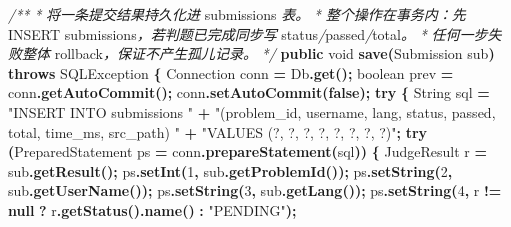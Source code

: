 \documentclass[
  11pt,
]{ctexart}
\newenvironment{Shaded}{\begin{snugshade}}{\end{snugshade}}
\newcommand{\BuiltInTok}[1]{#1}
\newcommand{\CommentTok}[1]{\textcolor[rgb]{0.56,0.35,0.01}{\textit{#1}}}
\newcommand{\ControlFlowTok}[1]{\textcolor[rgb]{0.13,0.29,0.53}{\textbf{#1}}}
\newcommand{\DataTypeTok}[1]{\textcolor[rgb]{0.13,0.29,0.53}{#1}}
\newcommand{\DecValTok}[1]{\textcolor[rgb]{0.00,0.00,0.81}{#1}}
\newcommand{\FunctionTok}[1]{\textcolor[rgb]{0.13,0.29,0.53}{\textbf{#1}}}
\newcommand{\KeywordTok}[1]{\textcolor[rgb]{0.13,0.29,0.53}{\textbf{#1}}}
\newcommand{\NormalTok}[1]{#1}
\newcommand{\OperatorTok}[1]{\textcolor[rgb]{0.81,0.36,0.00}{\textbf{#1}}}
\newcommand{\StringTok}[1]{\textcolor[rgb]{0.31,0.60,0.02}{#1}}
\begin{document}
\begin{Shaded}
\begin{Highlighting}[]
    \CommentTok{/**}
     \CommentTok{*} \CommentTok{将一条提交结果持久化进}\NormalTok{ submissions }\CommentTok{表。}
     \CommentTok{*} \CommentTok{整个操作在事务内：先}\NormalTok{ INSERT submissions}\CommentTok{，若判题已完成同步写}\NormalTok{ status}\CommentTok{/}\NormalTok{passed}\CommentTok{/}\NormalTok{total}\CommentTok{。}
     \CommentTok{*} \CommentTok{任何一步失败整体}\NormalTok{ rollback}\CommentTok{，保证不产生孤儿记录。}
     \CommentTok{*/}
    \KeywordTok{public} \DataTypeTok{void} \FunctionTok{save}\OperatorTok{(}\NormalTok{Submission sub}\OperatorTok{)} \KeywordTok{throws} \BuiltInTok{SQLException} \OperatorTok{\{}
        \BuiltInTok{Connection}\NormalTok{ conn }\OperatorTok{=}\NormalTok{ Db}\OperatorTok{.}\FunctionTok{get}\OperatorTok{();}
        \DataTypeTok{boolean}\NormalTok{ prev }\OperatorTok{=}\NormalTok{ conn}\OperatorTok{.}\FunctionTok{getAutoCommit}\OperatorTok{();}
\NormalTok{        conn}\OperatorTok{.}\FunctionTok{setAutoCommit}\OperatorTok{(}\KeywordTok{false}\OperatorTok{);}
        \ControlFlowTok{try} \OperatorTok{\{}
            \BuiltInTok{String}\NormalTok{ sql }\OperatorTok{=} \StringTok{"INSERT INTO submissions "} \OperatorTok{+}
                         \StringTok{"(problem\_id, username, lang, status, passed, total, time\_ms, src\_path) "} \OperatorTok{+}
                         \StringTok{"VALUES (?, ?, ?, ?, ?, ?, ?, ?)"}\OperatorTok{;}
            \ControlFlowTok{try} \OperatorTok{(}\BuiltInTok{PreparedStatement}\NormalTok{ ps }\OperatorTok{=}\NormalTok{ conn}\OperatorTok{.}\FunctionTok{prepareStatement}\OperatorTok{(}\NormalTok{sql}\OperatorTok{))} \OperatorTok{\{}
\NormalTok{                JudgeResult r }\OperatorTok{=}\NormalTok{ sub}\OperatorTok{.}\FunctionTok{getResult}\OperatorTok{();}
\NormalTok{                ps}\OperatorTok{.}\FunctionTok{setInt}\OperatorTok{(}\DecValTok{1}\OperatorTok{,}\NormalTok{ sub}\OperatorTok{.}\FunctionTok{getProblemId}\OperatorTok{());}
\NormalTok{                ps}\OperatorTok{.}\FunctionTok{setString}\OperatorTok{(}\DecValTok{2}\OperatorTok{,}\NormalTok{ sub}\OperatorTok{.}\FunctionTok{getUserName}\OperatorTok{());}
\NormalTok{                ps}\OperatorTok{.}\FunctionTok{setString}\OperatorTok{(}\DecValTok{3}\OperatorTok{,}\NormalTok{ sub}\OperatorTok{.}\FunctionTok{getLang}\OperatorTok{());}
\NormalTok{                ps}\OperatorTok{.}\FunctionTok{setString}\OperatorTok{(}\DecValTok{4}\OperatorTok{,}\NormalTok{ r }\OperatorTok{!=} \KeywordTok{null} \OperatorTok{?}\NormalTok{ r}\OperatorTok{.}\FunctionTok{getStatus}\OperatorTok{().}\FunctionTok{name}\OperatorTok{()} \OperatorTok{:} \StringTok{"PENDING"}\OperatorTok{);}

\end{Highlighting}
\end{Shaded}
\end{document}
